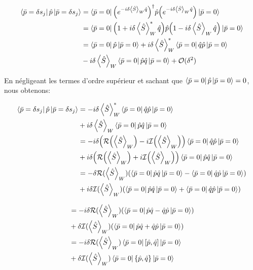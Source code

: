 \begin{onehalfspace}
    \begin{align}
        \bra{\bar{p} = \delta s_j}\hat{p}\ket{\bar{p}=\delta s_j} &= \bra{\bar{p}=0} \Bigl(e^{-i\delta \expval{\hat{S}}_W \hat{q}}\Bigr)^{\dagger} \hat{p} \Bigl(e^{-i\delta \expval{\hat{S}}_W \hat{q}}\Bigr) \ket{\bar{p}=0}\\
        &= \bra{\bar{p}=0} \Bigl(1 + i\delta \expval{\hat{S}}_W^{*} \hat{q}\Bigr) \hat{p} \Bigl(1 - i\delta \expval{\hat{S}}_W \hat{q}\Bigr) \ket{\bar{p}=0}\\
        &= \bra{\bar{p}=0} \hat{p} \ket{\bar{p}=0} + i\delta \expval{\hat{S}}_W^{*} \bra{\bar{p}=0} \hat{q}\hat{p} \ket{\bar{p}=0}\\
        &- i\delta \expval{\hat{S}}_W \bra{\bar{p}=0} \hat{p}\hat{q} \ket{\bar{p}=0} + \mathcal{O}(\delta^2)
    \end{align}

    \noindent En négligeant les termes d’ordre supérieur et sachant que  
    $\bra{\bar{p}=0}\hat{p}\ket{\bar{p}=0} = 0$, nous obtenons:

    \begin{align}
        \bra{\bar{p} = \delta s_j}\hat{p}\ket{\bar{p}=\delta s_j} &=  -i\delta \expval{\hat{S}}_W^{*} \bra{\bar{p}=0} \hat{q}\hat{p} \ket{\bar{p}=0} \\
        &+ i\delta \expval{\hat{S}}_W \bra{\bar{p}=0} \hat{p}\hat{q} \ket{\bar{p}=0}\\
        &= -i\delta \Bigl( \mathcal{R}\Bigl(\expval{\hat{S}}_W\Bigr) - i\mathcal{I}\Bigl(\expval{\hat{S}}_W\Bigr) \Bigr) \bra{\bar{p}=0} \hat{q}\hat{p} \ket{\bar{p}=0}\\
        &+ i\delta \Bigl( \mathcal{R}\Bigl(\expval{\hat{S}}_W\Bigr) + i\mathcal{I}\Bigl(\expval{\hat{S}}_W\Bigr) \Bigr) \bra{\bar{p}=0} \hat{p}\hat{q} \ket{\bar{p}=0}\\
        &= -\delta \mathcal{R}(\expval{\hat{S}}_W)(\bra{\bar{p} = 0}\hat{p}\hat{q} \ket{\bar{p} = 0} - \bra{\bar{p} = 0}\hat{q}\hat{p} \ket{\bar{p} = 0})\\
        &+ i\delta \mathcal{I}(\expval{\hat{S}}_W)(\bra{\bar{p} = 0}\hat{p}\hat{q} \ket{\bar{p} = 0} + \bra{\bar{p} = 0}\hat{q}\hat{p} \ket{\bar{p} = 0})
    \end{align} 

    \begin{align}
        &= -i\delta \mathcal{R}(\expval{\hat{S}}_W)(\bra{\bar{p} = 0}\hat{p}\hat{q} - \hat{q}\hat{p}\ket{\bar{p} = 0})\\
        &+ \delta \mathcal{I}(\expval{\hat{S}}_W)(\bra{\bar{p} = 0}\hat{p}\hat{q} + \hat{q}\hat{p}\ket{\bar{p} = 0})\\
        &= -i\delta \mathcal{R}(\expval{\hat{S}}_W) \bra{\bar{p} = 0}[\hat{p},\hat{q}]\ket{\bar{p} = 0} \\
        &+ \delta \mathcal{I}(\expval{\hat{S}}_W) \bra{\bar{p} = 0}\{\hat{p},\hat{q}\}\ket{\bar{p} = 0}
    \end{align}


\end{onehalfspace}
